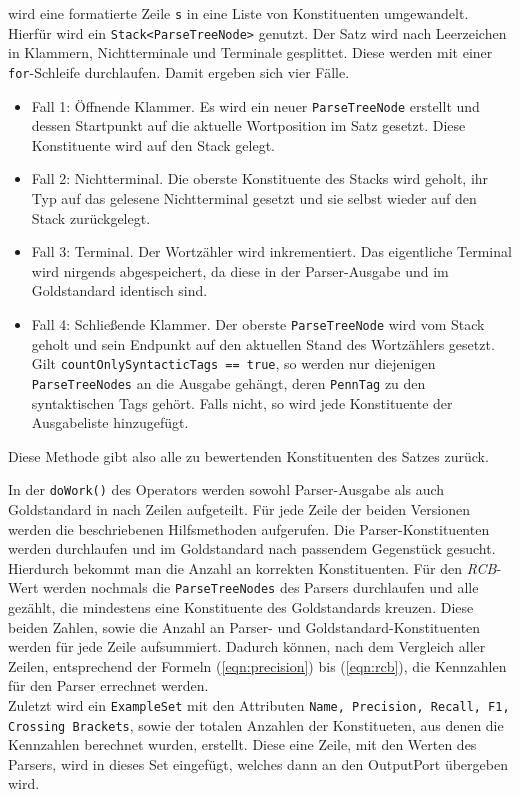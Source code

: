 wird eine formatierte Zeile \texttt{s} in eine Liste von Konstituenten umgewandelt. Hierfür wird ein \texttt{Stack<ParseTreeNode>} genutzt. Der Satz wird nach Leerzeichen in Klammern, Nichtterminale und Terminale gesplittet. Diese werden mit einer \texttt{for}-Schleife durchlaufen. Damit ergeben sich vier Fälle. 
\begin{itemize}
\item Fall 1: Öffnende Klammer. Es wird ein neuer \texttt{ParseTreeNode} erstellt und dessen Startpunkt auf die aktuelle Wortposition im Satz gesetzt. Diese Konstituente wird auf den Stack gelegt.
\item Fall 2: Nichtterminal. Die oberste Konstituente des Stacks wird geholt, ihr Typ auf das gelesene Nichtterminal gesetzt und sie selbst wieder auf den Stack zurückgelegt.
\item Fall 3: Terminal. Der Wortzähler wird inkrementiert. Das eigentliche Terminal wird nirgends abgespeichert, da diese in der Parser-Ausgabe und im Goldstandard identisch sind. 
\item Fall 4: Schließende Klammer. Der oberste \texttt{ParseTreeNode} wird vom Stack geholt und sein Endpunkt auf den aktuellen Stand des Wortzählers gesetzt. Gilt \texttt{countOnlySyntacticTags == true}, so werden nur diejenigen \texttt{ParseTreeNodes} an die Ausgabe gehängt, deren \texttt{PennTag} zu den syntaktischen Tags gehört. Falls nicht, so wird jede Konstituente der Ausgabeliste hinzugefügt.
\end{itemize}
Diese Methode gibt also alle zu bewertenden Konstituenten des Satzes zurück. 

In der \texttt{doWork()} des Operators werden sowohl Parser-Ausgabe als auch Goldstandard in nach Zeilen aufgeteilt. Für jede Zeile der beiden Versionen werden die beschriebenen Hilfsmethoden aufgerufen. Die Parser-Konstituenten werden durchlaufen und im Goldstandard nach passendem Gegenstück gesucht. Hierdurch bekommt man die Anzahl an korrekten Konstituenten. Für den \textit{RCB}-Wert werden nochmals die \texttt{ParseTreeNodes} des Parsers durchlaufen und alle gezählt, die mindestens eine Konstituente des Goldstandards kreuzen. Diese beiden Zahlen, sowie die Anzahl an Parser- und Goldstandard-Konstituenten werden für jede Zeile aufsummiert. Dadurch können, nach dem Vergleich aller Zeilen, entsprechend der Formeln (\ref{eqn:precision}) bis (\ref{eqn:rcb}), die Kennzahlen für den Parser errechnet werden. \\
Zuletzt wird ein \texttt{ExampleSet} mit den Attributen \texttt{Name, Precision, Recall, F1, Crossing Brackets}, sowie der totalen Anzahlen der Konstitueten, aus denen die Kennzahlen berechnet wurden, erstellt. Diese eine Zeile, mit den Werten des Parsers, wird in dieses Set eingefügt, welches dann an den OutputPort übergeben wird. 

